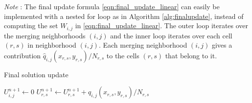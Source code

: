 \noindent\textit{Note }: The final update formula \eqref{eqn:final_update_linear} can easily be implemented with a 
nested for loop as in Algorithm \ref{alg:finalupdate},  
instead of computing the set $W_{i,j}$ in \eqref{eqn:final_update_linear}.  
The outer loop iterates over the merging neighborhoods $(i,j)$ and the inner loop iterates over each cell $(r,s)$ in neighborhood $(i,j)$.  Each merging neighborhood $(i,j)$ gives a contribution $ \hat{q}_{i,j}(x_{r,s}, y_{r,s})/N_{r,s} $ to the cells $(r,s)$ that belong to it. 
\begin{algorithm}[H]
		\caption{\sf Final solution update} \label{alg:finalupdate}
	\begin{algorithmic}
	\State $U^{n+1}_{i,j} \leftarrow 0$
	\EndFor
			\State $U^{n+1}_{r,s} \leftarrow U^{n+1}_{r,s} + \hat{q}_{i,j}(x_{r,s}, y_{r,s})/N_{r,s} $
		\EndFor
	\EndFor
	\end{algorithmic}
\end{algorithm}




